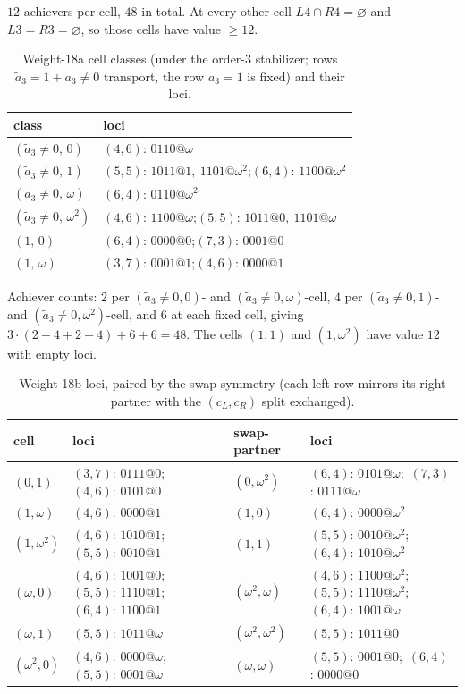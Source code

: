 \documentclass[11pt]{article}
\theoremstyle{plain}
\theoremstyle{definition}
\theoremstyle{remark}
\begin{document}
\noindent $12$ achievers per cell, $48$ in total. At every other cell $L4\cap R4=\varnothing$
and $L3=R3=\varnothing$, so those cells have value $\ge 12$.

\begin{table}[h]
\centering
\caption{Weight-18a cell classes (under the order-$3$ stabilizer; rows $\tilde a_3=1+a_3\ne0$
transport, the row $a_3=1$ is fixed) and their loci.}
\label{tab:wt18a}
\begin{tabular}{ll}
\toprule
class & loci\\
\midrule
$(\tilde a_3\ne 0,\,0)$        & $(4,6)$: $0110@\omega$\\
$(\tilde a_3\ne 0,\,1)$        & $(5,5)$: $1011@1,\ 1101@\omega^2$;\quad $(6,4)$: $1100@\omega^2$\\
$(\tilde a_3\ne 0,\,\omega)$   & $(6,4)$: $0110@\omega^2$\\
$(\tilde a_3\ne 0,\,\omega^2)$ & $(4,6)$: $1100@\omega$;\quad $(5,5)$: $1011@0,\ 1101@\omega$\\
$(1,\,0)$                      & $(6,4)$: $0000@0$;\quad $(7,3)$: $0001@0$\\
$(1,\,\omega)$                 & $(3,7)$: $0001@1$;\quad $(4,6)$: $0000@1$\\
\bottomrule
\end{tabular}
\end{table}

\noindent Achiever counts: $2$ per $(\tilde a_3\ne 0,0)$- and $(\tilde a_3\ne 0,\omega)$-cell,
$4$ per $(\tilde a_3\ne 0,1)$- and $(\tilde a_3\ne 0,\omega^2)$-cell, and $6$ at each fixed
cell, giving $3\cdot(2+4+2+4)+6+6=48$. The cells $(1,1)$ and $(1,\omega^2)$ have value $12$
with empty loci.

\begin{table}[h]
\centering
\caption{Weight-18b loci, paired by the swap symmetry (each left row mirrors its right
partner with the $(c_L,c_R)$ split exchanged).}
\label{tab:wt18b}
\begin{tabular}{llcll}
\toprule
cell & loci & & swap-partner & loci\\
\midrule
$(0,1)$        & $(3,7)$: $0111@0$;\ $(4,6)$: $0101@0$        & & $(0,\omega^2)$ & $(6,4)$: $0101@\omega$;\ $(7,3)$: $0111@\omega$\\
$(1,\omega)$   & $(4,6)$: $0000@1$                            & & $(1,0)$        & $(6,4)$: $0000@\omega^2$\\
$(1,\omega^2)$ & $(4,6)$: $1010@1$;\ $(5,5)$: $0010@1$        & & $(1,1)$        & $(5,5)$: $0010@\omega^2$;\ $(6,4)$: $1010@\omega^2$\\
$(\omega,0)$   & $(4,6)$: $1001@0$;\ $(5,5)$: $1110@1$;\ $(6,4)$: $1100@1$ & & $(\omega^2,\omega)$ & $(4,6)$: $1100@\omega^2$;\ $(5,5)$: $1110@\omega^2$;\ $(6,4)$: $1001@\omega$\\
$(\omega,1)$   & $(5,5)$: $1011@\omega$                       & & $(\omega^2,\omega^2)$ & $(5,5)$: $1011@0$\\
$(\omega^2,0)$ & $(4,6)$: $0000@\omega$;\ $(5,5)$: $0001@\omega$ & & $(\omega,\omega)$ & $(5,5)$: $0001@0$;\ $(6,4)$: $0000@0$\\
\bottomrule
\end{tabular}
\end{table}
\end{document}
